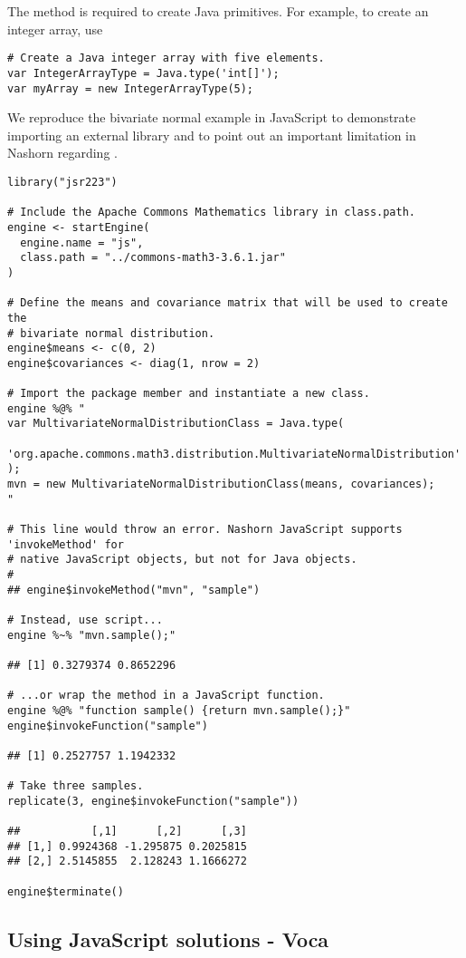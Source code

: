 The  method is required to create Java primitives. For example, to create an integer array, use

\begin{verbatim}
# Create a Java integer array with five elements.
var IntegerArrayType = Java.type('int[]');
var myArray = new IntegerArrayType(5); 
\end{verbatim}

We reproduce the bivariate normal example in JavaScript to demonstrate importing an external library and to point out an important limitation in Nashorn regarding .

\begin{verbatim}
library("jsr223")

# Include the Apache Commons Mathematics library in class.path.
engine <- startEngine(
  engine.name = "js",
  class.path = "../commons-math3-3.6.1.jar"
)

# Define the means and covariance matrix that will be used to create the
# bivariate normal distribution.
engine$means <- c(0, 2)
engine$covariances <- diag(1, nrow = 2)

# Import the package member and instantiate a new class.
engine %@% "
var MultivariateNormalDistributionClass = Java.type(
  'org.apache.commons.math3.distribution.MultivariateNormalDistribution'
);
mvn = new MultivariateNormalDistributionClass(means, covariances);
"

# This line would throw an error. Nashorn JavaScript supports 'invokeMethod' for
# native JavaScript objects, but not for Java objects.
# 
## engine$invokeMethod("mvn", "sample")

# Instead, use script...
engine %~% "mvn.sample();"

## [1] 0.3279374 0.8652296

# ...or wrap the method in a JavaScript function.
engine %@% "function sample() {return mvn.sample();}"
engine$invokeFunction("sample")

## [1] 0.2527757 1.1942332

# Take three samples.
replicate(3, engine$invokeFunction("sample"))

##           [,1]      [,2]      [,3]
## [1,] 0.9924368 -1.295875 0.2025815
## [2,] 2.5145855  2.128243 1.1666272

engine$terminate()
\end{verbatim}

\subsection{Using JavaScript solutions - Voca}

